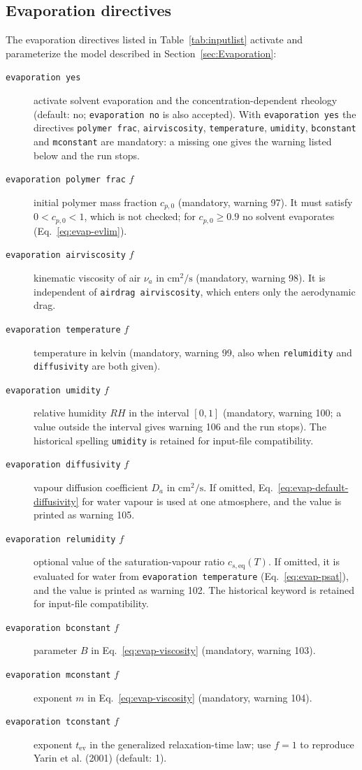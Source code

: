 
\subsection{Evaporation directives\label{subsec:Evaporation-directives}}

The evaporation directives listed in Table~\ref{tab:inputlist} activate
and parameterize the model described in Section~\ref{sec:Evaporation}:
\begin{description}
 \item[\texttt{evaporation yes}] activate solvent evaporation and the
 concentration-dependent rheology (default: no; \texttt{evaporation no}
 is also accepted). With \texttt{evaporation yes} the directives
 \texttt{polymer frac}, \texttt{airviscosity}, \texttt{temperature},
 \texttt{umidity}, \texttt{bconstant} and \texttt{mconstant} are
 mandatory: a missing one gives the warning listed below and the run
 stops.
 \item[\texttt{evaporation polymer frac} $f$] initial polymer mass
 fraction $c_{p,0}$ (mandatory, warning 97). It must satisfy
 $0<c_{p,0}<1$, which is not checked; for $c_{p,0}\geq0.9$ no solvent
 evaporates (Eq.~\ref{eq:evap-evlim}).
 \item[\texttt{evaporation airviscosity} $f$] kinematic viscosity of
 air $\nu_a$ in $\mathrm{cm^2/s}$ (mandatory, warning 98). It is
 independent of \texttt{airdrag airviscosity}, which enters only the
 aerodynamic drag.
 \item[\texttt{evaporation temperature} $f$] temperature in kelvin
 (mandatory, warning 99, also when \texttt{relumidity} and
 \texttt{diffusivity} are both given).
 \item[\texttt{evaporation umidity} $f$] relative humidity $RH$ in the
 interval $[0,1]$ (mandatory, warning 100; a value outside the interval
 gives warning 106 and the run stops). The historical spelling
 \texttt{umidity} is retained for input-file compatibility.
 \item[\texttt{evaporation diffusivity} $f$] vapour diffusion coefficient
 $D_a$ in $\mathrm{cm^2/s}$. If omitted,
 Eq.~\ref{eq:evap-default-diffusivity} for water vapour is used at one
 atmosphere, and the value is printed as warning 105.
 \item[\texttt{evaporation relumidity} $f$] optional value of the
 saturation-vapour ratio $c_{s,\mathrm{eq}}(T)$. If omitted, it is
 evaluated for water from \texttt{evaporation temperature}
 (Eq.~\ref{eq:evap-psat}), and the value is printed as warning 102.
 The historical keyword is retained for input-file compatibility.
 \item[\texttt{evaporation bconstant} $f$] parameter $B$ in
 Eq.~\ref{eq:evap-viscosity} (mandatory, warning 103).
 \item[\texttt{evaporation mconstant} $f$] exponent $m$ in
 Eq.~\ref{eq:evap-viscosity} (mandatory, warning 104).
 \item[\texttt{evaporation tconstant} $f$] exponent
 $t_{\mathrm{ev}}$ in the generalized relaxation-time law; use $f=1$
 to reproduce Yarin et al. (2001) (default: 1).
\end{description}
